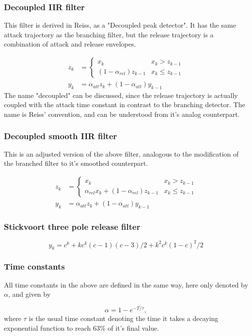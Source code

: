 \documentclass[]{article}
\begin{document}
\subsubsection{Decoupled IIR filter}
This filter is derived in Reiss, as a "Decoupled peak detector". It has the same attack trajectory as the branching filter, but the release trajectory is a combination of attack and release envelopes.

\begin{equation}
\begin{split}
z_k &= \begin{cases}
    x_k 								& x_k > z_{k-1} \\
   (1-\alpha_{rel}) z_{k-1} 					& x_k \leq z_{k-1}
\end{cases} \\
y_k &= \alpha_{att} z_k + (1-\alpha_{att}) y_{k-1}
\end{split}
\end{equation}
The name "decoupled" can be discussed, since the release trajectory is actually coupled with the attack time constant in contrast to the branching detector. The name is Reiss' convention, and can be understood from it's analog counterpart.

\subsubsection{Decoupled smooth IIR filter}
This is an adjusted version of the above filter, analogous to the modification of the branched filter to it's smoothed counterpart.

\begin{equation}
\begin{split}
z_k &= \begin{cases}
    x_k 								& x_k > z_{k-1} \\
    \alpha_{rel} x_k + (1-\alpha_{rel}) z_{k-1} 	& x_k \leq z_{k-1}
\end{cases} \\
y_k &= \alpha_{att} z_k + (1-\alpha_{att}) y_{k-1}
\end{split}
\end{equation}

\subsubsection{Stickvoort three pole release filter}
\begin{equation}
y_k = c^k+ k c^k (c - 1)(c - 3)/2 + k^2 c^k (1 - c)^2/2
\end{equation}

\subsubsection{Time constants}
All time constants in the above are defined in the same way, here only denoted by $\alpha$, and given by

\begin{equation}
\alpha = 1- e^{-T/ \tau},
\end{equation}
where $\tau$ is the usual time constant denoting the time it takes a decaying exponential function to reach $63 \%$ of it's final value.
\end{document}
